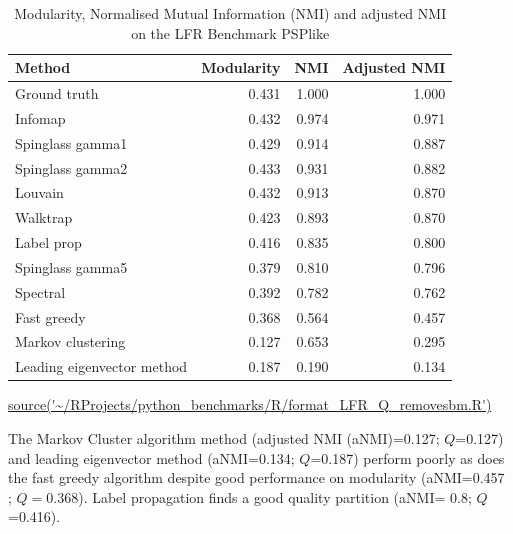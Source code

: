 \begin{table}[ht]
\centering
\setlength{\extrarowheight}{2pt}
\begin{tabular}{lrrr}
  \toprule
Method & Modularity & NMI & Adjusted NMI \\ 
  \midrule
Ground truth & 0.431 & 1.000 & 1.000 \\ 
  Infomap & 0.432 & 0.974 & 0.971 \\ 
  Spinglass gamma1 & 0.429 & 0.914 & 0.887 \\ 
  Spinglass gamma2 & 0.433 & 0.931 & 0.882 \\ 
  Louvain & 0.432 & 0.913 & 0.870 \\ 
  Walktrap & 0.423 & 0.893 & 0.870 \\ 
  Label prop & 0.416 & 0.835 & 0.800 \\ 
  Spinglass gamma5 & 0.379 & 0.810 & 0.796 \\ 
  Spectral & 0.392 & 0.782 & 0.762 \\ 
  Fast greedy & 0.368 & 0.564 & 0.457 \\ 
  Markov clustering & 0.127 & 0.653 & 0.295 \\ 
  Leading eigenvector method & 0.187 & 0.190 & 0.134 \\ 
   \bottomrule
\end{tabular}
\caption[Modularity, NMI and adjusted NMI on LFR benchmark]{Modularity, Normalised Mutual Information (NMI) and adjusted NMI on the LFR Benchmark PSPlike} 
\tiny\url{source('~/RProjects/python_benchmarks/R/format_LFR_Q_removesbm.R')}
\label{tab:Modularity, NMI and adjusted NMI on the LFR Benchmark PSPlike1}
\end{table}


The Markov Cluster algorithm method (adjusted NMI (aNMI)=0.127; $Q$=0.127) and leading eigenvector method (aNMI=0.134; $Q$=0.187) perform poorly as does the fast greedy algorithm   despite good performance on modularity  (aNMI=0.457 ; $Q=$0.368). Label propagation finds a good quality partition (aNMI= 0.8; $Q$=0.416). 


